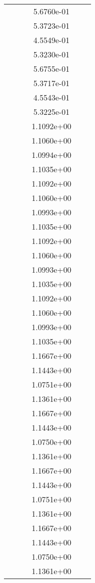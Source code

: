 \begin{xltabular}{\textwidth}{r|rS[table-format=1.3e+2]S[table-format=1.4e+2]S[table-format=1.4e+2]S[table-format=-1.5]}
&  &  & 5.6760e-01 & & \\
&  &  & 5.3723e-01 & & \\
&  &  & 4.5549e-01 & & \\
&  &  & 5.3230e-01 & & \\
&  &  & 5.6755e-01 & & \\
&  &  & 5.3717e-01 & & \\
&  &  & 4.5543e-01 & & \\
&  &  & 5.3225e-01 & & \\
&  &  & 1.1092e+00 & & \\
&  &  & 1.1060e+00 & & \\
&  &  & 1.0994e+00 & & \\
&  &  & 1.1035e+00 & & \\
&  &  & 1.1092e+00 & & \\
&  &  & 1.1060e+00 & & \\
&  &  & 1.0993e+00 & & \\
&  &  & 1.1035e+00 & & \\
&  &  & 1.1092e+00 & & \\
&  &  & 1.1060e+00 & & \\
&  &  & 1.0993e+00 & & \\
&  &  & 1.1035e+00 & & \\
&  &  & 1.1092e+00 & & \\
&  &  & 1.1060e+00 & & \\
&  &  & 1.0993e+00 & & \\
&  &  & 1.1035e+00 & & \\
&  &  & 1.1667e+00 & & \\
&  &  & 1.1443e+00 & & \\
&  &  & 1.0751e+00 & & \\
&  &  & 1.1361e+00 & & \\
&  &  & 1.1667e+00 & & \\
&  &  & 1.1443e+00 & & \\
&  &  & 1.0750e+00 & & \\
&  &  & 1.1361e+00 & & \\
&  &  & 1.1667e+00 & & \\
&  &  & 1.1443e+00 & & \\
&  &  & 1.0751e+00 & & \\
&  &  & 1.1361e+00 & & \\
&  &  & 1.1667e+00 & & \\
&  &  & 1.1443e+00 & & \\
&  &  & 1.0750e+00 & & \\
&  &  & 1.1361e+00 & & \\

\end{xltabular}
